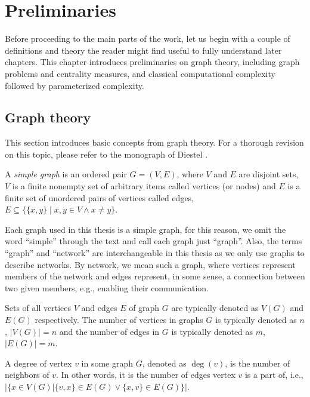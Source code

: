 \chapter{Preliminaries}

Before proceeding to the main parts of the work,
let us begin with a couple of definitions and theory the reader might find useful to fully understand later chapters.
This chapter introduces preliminaries on graph theory, including graph problems and centrality measures, and 
classical computational complexity followed by parameterized complexity.


\section{Graph theory}

This section introduces basic concepts from graph theory.
For a thorough revision on this topic, please refer to the monograph of Diestel \cite{Diestel2018}.

\begin{definition}
    A \emph{simple graph} is an ordered pair $G=(V,E)$, where $V$ and $E$ are disjoint sets,
    $V$ is a finite nonempty set of arbitrary items called vertices (or nodes) and 
    $E$ is a finite set of unordered pairs of vertices called edges, $E \subseteq \{\{x,y\} \mid x,y \in V \wedge x \neq y\}$.
\end{definition}

Each graph used in this thesis is a simple graph, for this reason,
we omit the word ``simple'' through the text and call each graph just ``graph''.
Also, the terms ``graph'' and ``network'' are interchangeable in this thesis as we only use graphs to describe networks.
By network, we mean such a graph, where vertices represent members of the network 
and edges represent, in some sense, a connection between two given members, e.g., enabling their communication.

Sets of all vertices $V$ and edges $E$ of graph $G$ are typically denoted as $V(G)$ and $E(G)$ respectively.
The number of vertices in graphs $G$ is typically denoted as $n$, $|V(G)| = n$ and
the number of edges in $G$ is typically denoted as $m$, $|E(G)| = m$.

\begin{definition}
    A degree of vertex $v$ in some graph $G$, denoted as $\deg(v)$, is the number of neighbors of $v$.
    In other words, it is the number of edges vertex $v$ is a part of, i.e.,
    $\Big|\{x \in V(G) \vert \{v,x\} \in E(G) \vee \{x,v\} \in E(G)\}\Big|$.
\end{definition}

